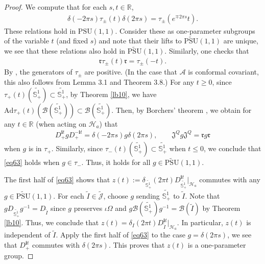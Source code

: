 \documentclass[12pt,a4paper]{article}
\theoremstyle{definition}
\theoremstyle{plain}
\newcommand{\fk}{\mathfrak}
\newcommand{\mc}{\mathcal}
\newcommand{\wtd}{\widetilde}
\newcommand{\PSU}{\mathrm{PSU}(1,1)}
\newcommand{\UPSU}{\widetilde{\mathrm{PSU}}(1,1)}
\newcommand{\Jtd}{\widetilde{\mathcal J}}
\newcommand{\Ad}{\mathrm{Ad}}
\newcommand{\im}{\mathbf{i}}
\newcommand{\mbb}{\mathbb}
\numberwithin{equation}{section}
\begin{document}
\begin{proof}
We compute that for each $s,t\in\mbb R$,
\begin{gather*}
\delta(-2\pi s)\tau_\pm(t)\delta(2\pi s)=\tau_\pm(e^{\mp 2\pi s}t).	
\end{gather*}
These relations hold in $\PSU$. Consider these as one-parameter subgroups of the variable $t$ (and fixed $s$) and note that their lifts to $\UPSU$ are unique, we see that these relations also hold in $\UPSU$. Similarly, one checks that
\begin{align*}
\fk r\tau_\pm(t)\fk r=\tau_\pm(-t).
\end{align*}
By \cite[Cor.4.4]{BCL98}, the generators of $\tau_\pm$ are positive. (In the case that $\mc A$ is conformal covariant, this also follows from \cite{Wei06} Lemma 3.1 and Theorem 3.8.) For any $t\geq 0$, since $\tau_+(t)(\wtd{\mbb S_+^1})\subset \wtd{\mbb S_+^1}$, by Theorem \ref{lb10}, we have $\Ad\tau_+(t)(\mc B( \wtd{\mbb S_+^1}))\subset \mc B( \wtd{\mbb S_+^1})$.  Then, by Borchers' theorem \cite[Thm. II.9]{Bor92}, we obtain for any $t\in\mbb R$ (when acting on $\mc H_a$) that
\begin{gather}
D_+^{\im t}gD_+^{-\im t}=\delta(-2\pi s)g\delta(2\pi s),\qquad \fk J^Q g \fk J^Q=\fk r g\fk r\label{eq63}
\end{gather}
when $g$ is in $\tau_+$. Similarly, since $\tau_-(t)(\wtd{\mbb S_+^1})\subset \wtd{\mbb S_+^1}$ when $t\leq 0$, we conclude that \eqref{eq63} holds when $g\in\tau_-$. Thus, it holds for all $g\in\UPSU$.

The first half of \eqref{eq63} shows that $z(t):=\delta_{\wtd {\mbb S_+^1}}(2\pi t)D_{\wtd {\mbb S_+^1}}^{\im t}|_{\mc H_a}$ commutes with any $g\in\UPSU$. For each $\wtd I\in\Jtd$, choose $g$ sending $\wtd {\mbb S_+^1}$ to $\wtd I$. Note that $gD_{\wtd {\mbb S_+^1}}g^{-1}=D_{\wtd I}$ since $g$ preserves $\iota\Omega$ and $g\mc B(\wtd{\mbb S_+^1})g^{-1}=\mc B(\wtd I)$ by Theorem \ref{lb10}. Thus, we conclude that $z(t)=\delta_I(2\pi t)D_{\wtd I}^{\im t}|_{\mc H_a}$. In particular, $z(t)$ is independent of $\wtd I$. Apply the first half of \eqref{eq63} to the case $g=\delta(2\pi s)$, we see that $D_+^{\im t}$ commutes with $\delta(2\pi s)$. This proves that $z(t)$ is a one-parameter group.
\end{proof}
\end{document}
